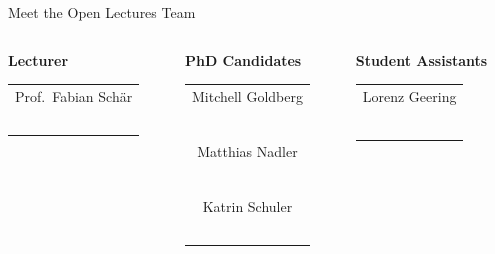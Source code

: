 \documentclass[handout]{beamer}
\begin{document}
\begin{frame}{Meet the Open Lectures Team}
	\begin{columns}[T]
		\begin{column}{0.33\textwidth}
			\center \textbf{Lecturer}
			\begin{table}\small
				\begin{tabular}{c}
					Prof.\ Fabian Schär\\
					\href{https://linkedin.com/in/fabian-schaer/}{\faLinkedinSquare}\ \href{https://twitter.com/chainomics}{\faTwitterSquare}\\
				\end{tabular}
			\end{table}
		\end{column}
		\begin{column}{0.33\textwidth}
			\center \textbf{PhD Candidates}
			\begin{table}\small
				\begin{tabular}{c}
					Mitchell Goldberg\\
					\href{https://linkedin.com/in/mitchell-goldberg/}{\faLinkedinSquare}\ \href{https://twitter.com/golmit_crypto}{\faTwitterSquare}\\
					\vspace{0.5em}\\
					Matthias Nadler\\
					\href{https://linkedin.com/in/mat-nadler/}{\faLinkedinSquare}\ \href{https://twitter.com/mat_nadler}{\faTwitterSquare}\\
					\vspace{0.5em}\\
					Katrin Schuler\\
					\href{https://linkedin.com/in/kmschuler/}{\faLinkedinSquare}\ \href{https://twitter.com/Katatcrypt}{\faTwitterSquare}\\
				\end{tabular}
			\end{table}
		\end{column}
		\begin{column}{0.33\textwidth}
			\center \textbf{Student Assistants}
			\begin{table}\small
				\begin{tabular}{c}
					Lorenz Geering\\
					\href{https://linkedin.com/in/lorenz-geering-770359a8/}{\faLinkedinSquare}\ \href{https://twitter.com/lorenz_geering}{\faTwitterSquare}\\
					\vspace{0.5em}\\

\end{tabular}
\end{table}
\end{column}
\end{columns}
\end{frame}
\end{document}
